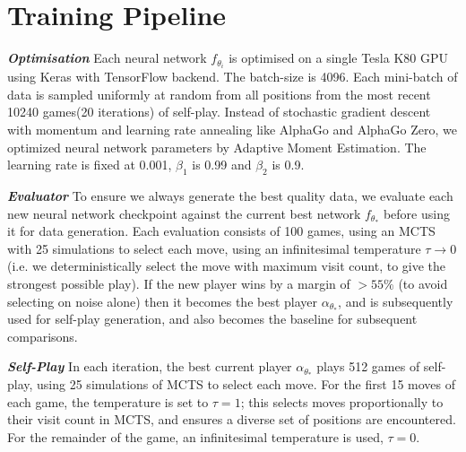 \documentclass[12pt,a4paper]{report}
\begin{document}
\section{Training Pipeline}
\hspace{0.6cm}\textit{\textbf{Optimisation}} Each neural network \(f_{\theta_i}\) is optimised on a single Tesla K80 GPU using Keras with TensorFlow backend. The batch-size is 4096. Each mini-batch of data is sampled uniformly at random from all positions from the most recent 10240 games(20 iterations) of self-play. Instead of stochastic gradient descent with momentum and learning rate annealing like AlphaGo and AlphaGo Zero, we optimized neural network parameters by Adaptive Moment Estimation\cite{Adam}. The learning rate is fixed at 0.001, \(\beta_1\) is 0.99 and \(\beta_2\) is 0.9.\par
\textit{\textbf{Evaluator}} To ensure we always generate the best quality data, we evaluate each new neural network checkpoint against the current best network \(f_{\theta_\ast}\) before using it for data generation. Each evaluation consists of 100 games, using an MCTS with 25 simulations to select each move, using an infinitesimal temperature \(\tau \to 0\) (i.e. we deterministically select the move with maximum visit count, to give the strongest possible play). If the new player wins by a margin of \(> 55\%\) (to avoid selecting on noise alone) then it becomes the best player \(\alpha_{\theta_\ast}\), and is subsequently used for self-play generation, and also becomes the baseline for subsequent comparisons.\par
\textit{\textbf{Self-Play}} In each iteration, the best current player \(\alpha_{\theta_\ast}\) plays 512 games of self-play, using 25 simulations of MCTS to select each move. For the first 15 moves of each game, the temperature is set to \(\tau = 1\); this selects moves proportionally to their visit count in MCTS, and ensures a diverse set of positions are encountered. For the remainder of the game, an infinitesimal temperature is used, \(\tau = 0\).\par
\end{document}
